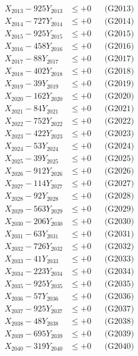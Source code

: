 \documentclass[a4paper,10pt]{article}
\begin{document}
{\begin{align}
X_{2013} - 925Y_{2013} &\leq +0 && \text{(G2013)} \\
X_{2014} - 727Y_{2014} &\leq +0 && \text{(G2014)} \\
X_{2015} - 925Y_{2015} &\leq +0 && \text{(G2015)} \\
X_{2016} - 458Y_{2016} &\leq +0 && \text{(G2016)} \\
X_{2017} - 88Y_{2017} &\leq +0 && \text{(G2017)} \\
X_{2018} - 402Y_{2018} &\leq +0 && \text{(G2018)} \\
X_{2019} - 39Y_{2019} &\leq +0 && \text{(G2019)} \\
X_{2020} - 162Y_{2020} &\leq +0 && \text{(G2020)} \\
\allowbreak
X_{2021} - 84Y_{2021} &\leq +0 && \text{(G2021)} \\
X_{2022} - 752Y_{2022} &\leq +0 && \text{(G2022)} \\
X_{2023} - 422Y_{2023} &\leq +0 && \text{(G2023)} \\
X_{2024} - 53Y_{2024} &\leq +0 && \text{(G2024)} \\
X_{2025} - 39Y_{2025} &\leq +0 && \text{(G2025)} \\
X_{2026} - 912Y_{2026} &\leq +0 && \text{(G2026)} \\
X_{2027} - 114Y_{2027} &\leq +0 && \text{(G2027)} \\
X_{2028} - 92Y_{2028} &\leq +0 && \text{(G2028)} \\
X_{2029} - 563Y_{2029} &\leq +0 && \text{(G2029)} \\
X_{2030} - 206Y_{2030} &\leq +0 && \text{(G2030)} \\
\allowbreak
X_{2031} - 63Y_{2031} &\leq +0 && \text{(G2031)} \\
X_{2032} - 726Y_{2032} &\leq +0 && \text{(G2032)} \\
X_{2033} - 41Y_{2033} &\leq +0 && \text{(G2033)} \\
X_{2034} - 223Y_{2034} &\leq +0 && \text{(G2034)} \\
X_{2035} - 925Y_{2035} &\leq +0 && \text{(G2035)} \\
X_{2036} - 57Y_{2036} &\leq +0 && \text{(G2036)} \\
X_{2037} - 925Y_{2037} &\leq +0 && \text{(G2037)} \\
X_{2038} - 48Y_{2038} &\leq +0 && \text{(G2038)} \\
X_{2039} - 695Y_{2039} &\leq +0 && \text{(G2039)} \\
X_{2040} - 319Y_{2040} &\leq +0 && \text{(G2040)} \\

\end{align}}
\end{document}
